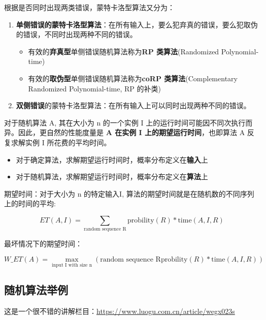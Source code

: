 \documentclass[./../main.tex]{subfiles} %
\begin{document}
\begin{enumerate}
    根据是否同时出现两类错误，蒙特卡洛型算法又分为：
    \begin{enumerate}
        \item \textbf{单侧错误的蒙特卡洛型算法}：在所有输入上，要么犯弃真的错误，要么犯取伪的错误，不同时出现两种不同的错误。
        \begin{itemize}
            \item 有效的\textbf{弃真型}单侧错误随机算法称为\textbf{RP 类算法}(Randomized Polynomial-time)
            \item 有效的\textbf{取伪型}单侧错误随机算法称为\textbf{coRP 类算法}(Complementary Randomized Polynomial-time, RP 的补类)
        \end{itemize}
        \item \textbf{双侧错误}的蒙特卡洛型算法：在所有输入上可以同时出现两种不同的错误。
    \end{enumerate}
\end{enumerate}

对于随机算法 A, 其在大小为 n 的一个实例 I 上的运行时间可能因不同次执行而异。因此，更自然的性能度量是 \textbf{A 在实例 I 上的期望运行时间}，也即算法 A 反复求解实例 I 所花费的平均时间。

\begin{itemize}
    \item 对于确定算法，求解期望运行时间时，概率分布定义在\textbf{输入}上
    \item 对于随机算法，求解期望运行时间时，概率分布定义在\textbf{算法}上
\end{itemize}

期望时间：对于大小为 n 的特定输入I, 算法的期望时间就是在随机数的不同序列上的时间的平均: 

\begin{equation*}
    ET(A,I)=\sum_{\text{random sequence R}}\text{probility}(R)*\text{time}(A,I,R)
\end{equation*}

最坏情况下的期望时间：

\begin{equation*}
   W\_ET(A)=\max_{\text{input I with size n}}(\text{random sequence R}\text{probility}(R)*\text{time}(A,I,R))
\end{equation*}

\subsection{随机算法举例}

这是一个很不错的讲解栏目：\url{https://www.luogu.com.cn/article/wegx023s}
\end{document}
